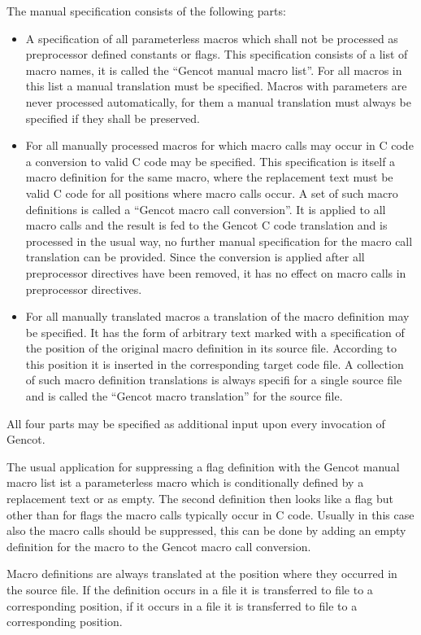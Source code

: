 The manual specification consists of the following parts:
\begin{itemize}
\item A specification of all parameterless macros which shall not be processed as preprocessor defined
constants or flags. This specification consists of a list of macro names, it is called the ``Gencot manual macro list''.
For all macros in this list a manual translation must be specified. Macros with parameters are never 
processed automatically, for them a manual translation must always be specified if they shall be preserved.
\item For all manually processed macros for which macro calls may occur in C code a conversion to valid C 
code may be specified.
This specification is itself a macro definition for the same macro, where the replacement text must be valid
C code for all positions where macro calls occur. A set of such macro definitions is called a ``Gencot macro 
call conversion''. It is applied to all macro calls and the result is fed to 
the Gencot C code translation and is processed in the usual way, no further manual specification for the macro call
translation can be provided. Since the conversion is applied after all preprocessor directives have been
removed, it has no effect on macro calls in preprocessor directives. 
\item For all manually translated macros a translation of the macro definition may be specified. It has the form 
of arbitrary text marked with a specification of the position of the original macro definition in its source file.
According to this position it is inserted in the corresponding target code file. A collection of such macro 
definition translations is always specifi for a single source file and is called the ``Gencot macro translation''
for the source file.
\end{itemize}
All four parts may be specified as additional input upon every invocation of Gencot.

The usual application for suppressing a flag definition with the Gencot manual macro list ist a parameterless macro
which is conditionally defined by a replacement text or as empty. The second definition then looks like a flag but
other than for flags the macro calls typically occur in C code. Usually in this case also the macro calls should
be suppressed, this can be done by adding an empty definition for the macro to the Gencot macro call conversion.

Macro definitions are always translated at the position where they occurred in the source file.
If the definition occurs in a file  it is transferred to file  to a corresponding position,
if it occurs in a file  it is transferred to file  to a corresponding position.

